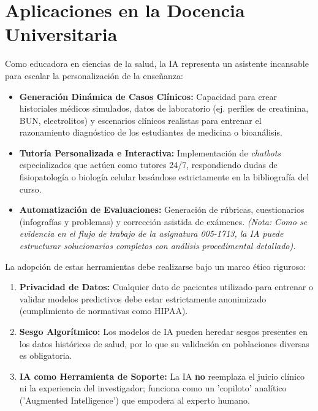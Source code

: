 \documentclass[12pt,letterpaper]{article}
\begin{document}
\section{Aplicaciones en la Docencia Universitaria}
Como educadora en ciencias de la salud, la IA representa un asistente incansable para escalar la personalización de la enseñanza:

\begin{itemize}[label=\textcolor{saludBlue}{\textbullet}, leftmargin=*]
    \item \textbf{Generación Dinámica de Casos Clínicos:} Capacidad para crear historiales médicos simulados, datos de laboratorio (ej. perfiles de creatinina, BUN, electrolitos) y escenarios clínicos realistas para entrenar el razonamiento diagnóstico de los estudiantes de medicina o bioanálisis.
    \item \textbf{Tutoría Personalizada e Interactiva:} Implementación de \textit{chatbots} especializados que actúen como tutores 24/7, respondiendo dudas de fisiopatología o biología celular basándose estrictamente en la bibliografía del curso.
    \item \textbf{Automatización de Evaluaciones:} Generación de rúbricas, cuestionarios (infografías y problemas) y corrección asistida de exámenes. \textit{(Nota: Como se evidencia en el flujo de trabajo de la asignatura 005-1713, la IA puede estructurar solucionarios completos con análisis procedimental detallado).}
\end{itemize}

\begin{tcolorbox}[
    enhanced,
    colback=saludLight,
    colframe=saludBlue,
    coltitle=white,
    fonttitle=\bfseries,
    title={Consideraciones Éticas y Buenas Prácticas},
    boxrule=1mm,
    arc=3mm
]
La adopción de estas herramientas debe realizarse bajo un marco ético riguroso:
\begin{enumerate}
    \item \textbf{Privacidad de Datos:} Cualquier dato de pacientes utilizado para entrenar o validar modelos predictivos debe estar estrictamente anonimizado (cumplimiento de normativas como HIPAA).
    \item \textbf{Sesgo Algorítmico:} Los modelos de IA pueden heredar sesgos presentes en los datos históricos de salud, por lo que su validación en poblaciones diversas es obligatoria.
    \item \textbf{IA como Herramienta de Soporte:} La IA \textbf{no} reemplaza el juicio clínico ni la experiencia del investigador; funciona como un 'copiloto' analítico ('Augmented Intelligence') que empodera al experto humano.
\end{enumerate}
\end{tcolorbox}
\end{document}
